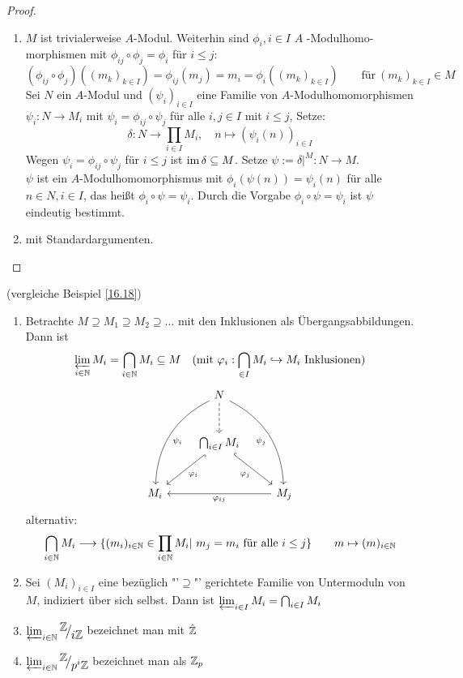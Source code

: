 \begin{proof}
	\begin{enumerate} [label = \alph*)]
		\item $M$ ist trivialerweise $A$-Modul. Weiterhin sind $\phi_i, i \in I $ $A$ -Modulhomo- morphismen mit $\phi_{ij} \circ \phi_j = \phi_i $ für $i \leq j$: \\
		$$ (\phi_{ij} \circ \phi_j)((m_k)_{k \in I}) = \phi_{ij}(m_j) = m_i= \phi_i((m_k)_{k \in I})  \quad \quad  \text{für} \ (m_k)_{k \in I } \in M $$ Sei $N$ ein $A$-Modul und $(\psi_i)_{i \in I} $ eine Familie von $A$-Modulhomomorphismen $\psi_i:N \to M_i $ mit $ \psi_i = \phi_{ij} \circ \psi_j $ für alle $i,j \in I $ mit $i \leq j$, Setze:  $$ \delta: N \to \prod_{i\in I} M_i, \quad n \mapsto (\psi_i(n))_{i \in I} $$ 
		Wegen $\psi_i = \phi_{ij} \circ \psi_j $ für $i \leq j $ ist $\operatorname{im}\delta \subseteq M $. Setze $\psi:= \delta \big|^M : N \to M$.\\ 
		$ \psi $ ist ein $A$-Modulhomomorphismus mit $\phi_i(\psi(n)) = \psi_i(n) $ für alle $ n \in N, i \in I $, das heißt $\phi_i \circ \psi = \psi_i$. Durch die Vorgabe $\phi_i \circ \psi = \psi_i $ ist $\psi $ eindeutig bestimmt. 
		\item mit Standardargumenten.
	\end{enumerate}
\end{proof}
\begin{bsp} \label{16.22} (vergleiche Beispiel \ref{16.18})
	\begin{enumerate}[label= \alph*)]
		\item Betrachte $M \supseteq M_1 \supseteq M_2 \supseteq \dots $ mit den Inklusionen als Übergangsabbildungen. Dann ist 
		$$\varprojlim_{i\in \mathbb{N}} M_i = \bigcap_{i\in \mathbb{N}} M_i \subseteq M \quad  (\text{mit} \ \varphi_i: \bigcap_{\in I} M_i \hookrightarrow M_i \  \text{Inklusionen}) $$
		$$ \begin{tikzcd}[row sep = large]
		& N \arrow[dashed]{d} \arrow[bend right]{ddl}{\psi_i}  \arrow[bend left, swap]{ddr}{\psi_j}& \\
		& \bigcap_{i\in I} M_i \arrow[hook]{dl}{\phi_i} \arrow[swap, hook]{dr}{\phi_j}& \\
	    M_i   & & M_j  \arrow{ll}{\phi_{ij}}
		\end{tikzcd}  $$
		alternativ: $$ \bigcap_{i \in \mathbb{N}} M_i \longrightarrow \{ (m_i)_{i \in \mathbb{N}} \in \prod_{i \in \mathbb{N}} M_i | \ m_j = m_i \ \text{für alle} \ i \leq j\}  \qquad m \mapsto (m)_{i \in \mathbb{N}}$$
		\item Sei $(M_i)_{i\in I}$ eine bezüglich "'$\supseteq$"' gerichtete Familie von Untermoduln von $M$, indiziert über sich selbst. Dann ist $\varprojlim_{i\in I} M_i = \bigcap_{i\in I} M_i$
		\item $\varprojlim_{i\in \N} \QR{\Z}{i \Z} $ bezeichnet man mit $\hat{\mathbb{Z}}$
		\item $\varprojlim_{i\in \N} \QR{\Z}{p^{i} \Z} $ bezeichnet man als $\mathbb{Z}_{p}$
	\end{enumerate}
\end{bsp}
